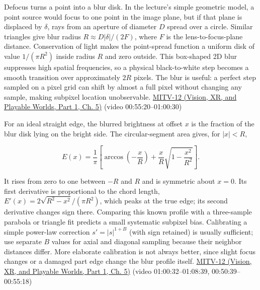 Defocus turns a point into a blur disk. In the lecture's simple geometric model, a point source would focus to one point in the image plane, but if that plane is displaced by \(\delta\), rays from an aperture of diameter \(D\) spread over a circle. Similar triangles give blur radius \(R\approx D|\delta|/(2F)\), where \(F\) is the lens-to-focus-plane distance. Conservation of light makes the point-spread function a uniform disk of value \(1/(\pi R^2)\) inside radius \(R\) and zero outside. This box-shaped 2D blur suppresses high spatial frequencies, so a physical black-to-white step becomes a smooth transition over approximately \(2R\) pixels. The blur is useful: a perfect step sampled on a pixel grid can shift by almost a full pixel without changing any sample, making subpixel location unobservable. \href{../07-Vision-XR-and-Playable-Worlds-P01/main.pdf\#nameddest=04-visual-computing-ii-ch036-mitv-12---blob-analysis-binary-image-processing-greens-theorem-derivative-and-integral}{MITV-12 (Vision, XR, and Playable Worlds, Part 1, Ch. 5)} (video 00:55:20--01:00:30)

For an ideal straight edge, the blurred brightness at offset \(x\) is the fraction of the blur disk lying on the bright side. The circular-segment area gives, for \(|x|<R\),

\[
E(x)=\frac{1}{\pi}\left[\arccos\left(-\frac{x}{R}\right)+\frac{x}{R}\sqrt{1-\frac{x^2}{R^2}}\right].
\]

It rises from zero to one between \(-R\) and \(R\) and is symmetric about \(x=0\). Its first derivative is proportional to the chord length, \(E'(x)=2\sqrt{R^2-x^2}/(\pi R^2)\), which peaks at the true edge; its second derivative changes sign there. Comparing this known profile with a three-sample parabola or triangle fit predicts a small systematic subpixel bias. Calibrating a simple power-law correction \(s'=|s|^{1+B}\) (with sign retained) is usually sufficient; use separate \(B\) values for axial and diagonal sampling because their neighbor distances differ. More elaborate calibration is not always better, since slight focus changes or a damaged part edge change the blur profile itself. \href{../07-Vision-XR-and-Playable-Worlds-P01/main.pdf\#nameddest=04-visual-computing-ii-ch036-mitv-12---blob-analysis-binary-image-processing-greens-theorem-derivative-and-integral}{MITV-12 (Vision, XR, and Playable Worlds, Part 1, Ch. 5)} (video 01:00:32--01:08:39, 00:50:39--00:55:18)

